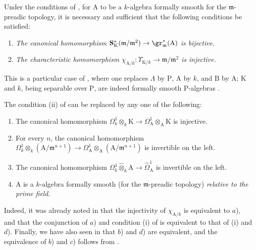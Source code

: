 \begin{theorem}[22.2.2]
\label{0.22.2.2}
Under the conditions of , for $\mathrm{A}$ to be a $k$-algebra formally smooth for the $\mathfrak{m}$-preadic topology, it is necessary and sufficient that the following conditions be satisfied:
\begin{enumerate}
  \item[\rm{(i)}] \emph{The canonical homomorphism $\mathbf{S}^*_\mathrm{K}(\mathfrak{m}/\mathfrak{m}^2)\to\gr^*_\mathfrak{m}(\mathrm{A})$ is bijective.}
  \item[\rm{(ii)}] \emph{The characteristic homomorphism $\chi_{\mathrm{A}/k}:\Upsilon_{\mathrm{K}/k}\to\mathfrak{m}/\mathfrak{m}^2$ is injective.}
\end{enumerate}
This is a particular case of , where one replaces $\Lambda$ by $\mathrm{P}$, $\mathrm{A}$ by $k$, and $\mathrm{B}$ by $\mathrm{A}$; $\mathrm{K}$ and $k$, being separable over $\mathrm{P}$, are indeed formally smooth $\mathrm{P}$-algebras .
\end{theorem}

\begin{remark}[22.2.3]
\label{0.22.2.3}
The condition (ii) of  can be replaced by any one of the following:
\begin{enumerate}
  \item[a)] The canonical homomorphism $\Omega^1_k\otimes_k\mathrm{K}\to\Omega^1_\mathrm{A}\otimes_\mathrm{A}\mathrm{K}$ is injective.
  \item[b)] For every $n$, the canonical homomorphism $\Omega^1_k\otimes_k(\mathrm{A}/\mathfrak{m}^{n+1})\to\Omega^1_\mathrm{A}\otimes_\mathrm{A}(\mathrm{A}/\mathfrak{m}^{n+1})$ is invertible on the left.
  \item[c)] The canonical homomorphism $\Omega^1_k\widehat{\otimes}_k\mathrm{A}\to\widehat{\Omega}^1_\mathrm{A}$ is invertible on the left.
  \item[d)] $\mathrm{A}$ is a $k$-algebra formally smooth (for the $\mathfrak{m}$-preadic topology) \emph{relative to the prime field}.
\end{enumerate}
Indeed, it was already noted in  that the injectivity of $\chi_{\mathrm{A}/k}$ is equivalent to $a$), and that the conjunction of $a$) and condition (i) of  is equivalent to that of (i) and $d$).
Finally, we have also seen in  that $b$) and $d$) are equivalent, and the equivalence of $b$) and $c$) follows from .
\end{remark}

